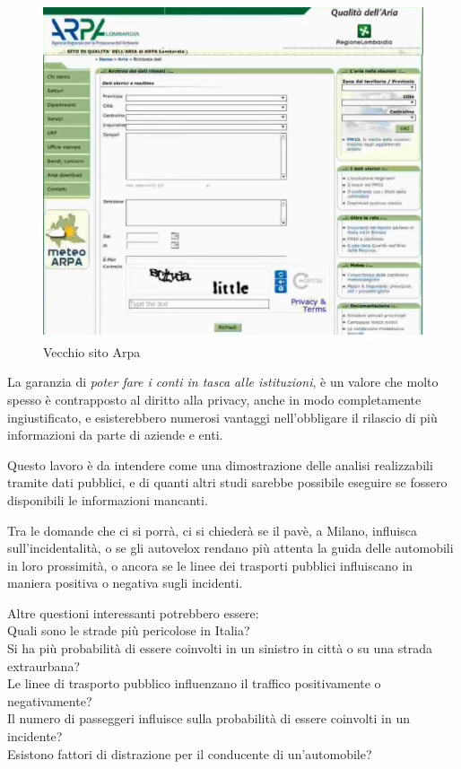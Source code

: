 \documentclass[a4paper]{report}
\newcommand{\quotestyle}[1]{\textit{#1}}
\begin{document}
\begin{figure}
    \hfill\includegraphics[width=0.7\linewidth]{img/arpa.png}\hspace*{\fill}
    \caption{Vecchio sito Arpa}
\end{figure}

La garanzia di \quotestyle{poter fare i conti in tasca alle istituzioni}, è un 
valore che molto spesso è contrapposto al diritto alla privacy, anche in 
modo completamente ingiustificato, e esisterebbero numerosi vantaggi nell'obbligare 
il rilascio di più informazioni da parte di aziende e enti. 

Questo lavoro è da intendere come una dimostrazione delle analisi realizzabili 
tramite dati pubblici, e di quanti altri studi sarebbe possibile eseguire se fossero 
disponibili le informazioni mancanti.

Tra le domande che ci si porrà, ci si chiederà se il pavè, a Milano, 
influisca sull'incidentalità, o se gli autovelox rendano più attenta 
la guida delle automobili in loro prossimità, o ancora se le linee dei trasporti pubblici 
influiscano in maniera positiva o negativa sugli incidenti.

Altre questioni interessanti potrebbero essere:\\
Quali sono le strade più pericolose in Italia?\\
Si ha più probabilità di essere coinvolti in un sinistro in città o 
su una strada extraurbana?\\
Le linee di trasporto pubblico influenzano il traffico positivamente o negativamente?\\
Il numero di passeggeri influisce sulla probabilità di essere coinvolti in un 
incidente?\\
Esistono fattori di distrazione per il conducente di un'automobile? 
\end{document}
